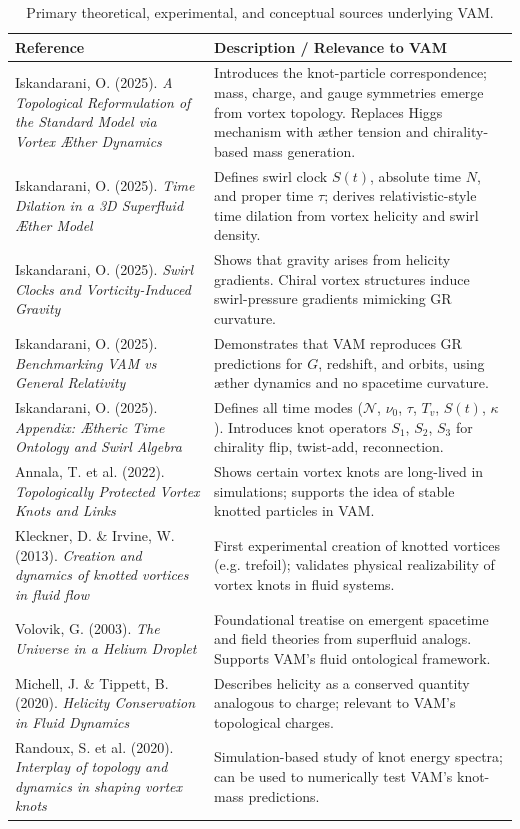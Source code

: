\documentclass[11pt]{article}
\begin{document}
\begin{table}[h!]
\centering
\begin{tabular}{|p{5.2cm}|p{9.5cm}|}
\hline
\textbf{Reference} & \textbf{Description / Relevance to VAM} \\
\hline
Iskandarani, O. (2025). \textit{A Topological Reformulation of the Standard Model via Vortex Æther Dynamics}~\cite{iskandarani2025vam5} & Introduces the knot-particle correspondence; mass, charge, and gauge symmetries emerge from vortex topology. Replaces Higgs mechanism with æther tension and chirality-based mass generation. \\
\hline
Iskandarani, O. (2025). \textit{Time Dilation in a 3D Superfluid Æther Model}~\cite{iskandarani2025vam1} & Defines swirl clock $S(t)$, absolute time $N$, and proper time $\tau$; derives relativistic-style time dilation from vortex helicity and swirl density. \\
\hline
Iskandarani, O. (2025). \textit{Swirl Clocks and Vorticity-Induced Gravity}~\cite{iskandarani2025vam2} & Shows that gravity arises from helicity gradients. Chiral vortex structures induce swirl-pressure gradients mimicking GR curvature. \\
\hline
Iskandarani, O. (2025). \textit{Benchmarking VAM vs General Relativity}~\cite{iskandarani2025VAM3} & Demonstrates that VAM reproduces GR predictions for $G$, redshift, and orbits, using æther dynamics and no spacetime curvature. \\
\hline
Iskandarani, O. (2025). \textit{Appendix: Ætheric Time Ontology and Swirl Algebra}~\cite{iskandarani2025vam2} & Defines all time modes ($\mathcal{N}$, $\nu_0$, $\tau$, $T_v$, $S(t)$, $\kappa$). Introduces knot operators $S_1$, $S_2$, $S_3$ for chirality flip, twist-add, reconnection. \\
\hline
Annala, T. et al. (2022). \textit{Topologically Protected Vortex Knots and Links} & Shows certain vortex knots are long-lived in simulations; supports the idea of stable knotted particles in VAM. \\
\hline
Kleckner, D. \& Irvine, W. (2013). \textit{Creation and dynamics of knotted vortices in fluid flow} & First experimental creation of knotted vortices (e.g. trefoil); validates physical realizability of vortex knots in fluid systems. \\
\hline
Volovik, G. (2003). \textit{The Universe in a Helium Droplet} & Foundational treatise on emergent spacetime and field theories from superfluid analogs. Supports VAM’s fluid ontological framework. \\
\hline
Michell, J. \& Tippett, B. (2020). \textit{Helicity Conservation in Fluid Dynamics} & Describes helicity as a conserved quantity analogous to charge; relevant to VAM's topological charges. \\
\hline
Randoux, S. et al. (2020). \textit{Interplay of topology and dynamics in shaping vortex knots} & Simulation-based study of knot energy spectra; can be used to numerically test VAM’s knot-mass predictions. \\
\hline
\end{tabular}
\caption{Primary theoretical, experimental, and conceptual sources underlying VAM.}
\end{table}
\end{document}
